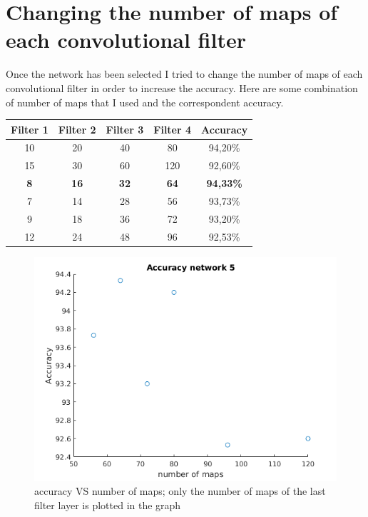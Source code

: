 \documentclass[]{report}
\begin{document}
\section{Changing the number of maps of each convolutional filter}

Once the network has been selected I tried to change the number of maps of each convolutional filter in order to increase the accuracy. Here are some combination of number of maps that I used and the correspondent accuracy.

\begin{table} [h]
\begin{center}
\begin{tabular}{|c|c|c|c|c|}
 \hline
 \textbf{Filter 1} & \textbf{Filter 2} & \textbf{Filter 3} & \textbf{Filter 4} & \textbf{Accuracy} \\ \hline
 10 & 20 & 40  & 80  & 94,20\%  \\ \hline
 15 & 30 & 60  & 120  & 92,60\%  \\ \hline
 \textbf{8} & \textbf{16} & \textbf{32}  & \textbf{64}  & \textbf{94,33\%}  \\ \hline
 7 & 14 & 28  & 56  & 93,73\%  \\ \hline
 9 & 18 & 36  & 72  & 93,20\%  \\ \hline
 12 & 24 & 48  & 96  & 92,53\%  \\ \hline
 
\end{tabular}
\end{center} 
\end{table}
  
\begin{figure}[h]
	\begin{center}
		\includegraphics[scale=0.6]{maps_accuracy.png}
		\caption{accuracy VS number of maps; only the number of maps of the last filter layer is plotted in the 					 graph}
		\label{fig:accuracyMaps}
	\end{center}
\end{figure}
\end{document}
